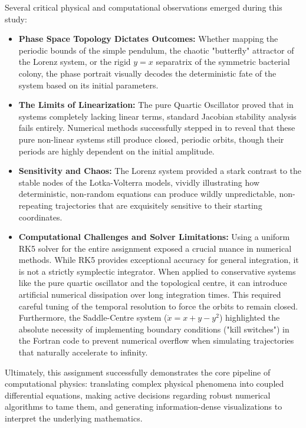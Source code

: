 \documentclass[12pt, a4paper, twoside]{article}
\begin{document}
    Several critical physical and computational observations emerged during this study:
    \begin{itemize}
        \item {\bf Phase Space Topology Dictates Outcomes:} Whether mapping the periodic bounds of the simple pendulum, the chaotic "butterfly" attractor of the Lorenz system, or the rigid $y = x$ separatrix of the symmetric bacterial colony, the phase portrait visually decodes the deterministic fate of the system based on its initial parameters.
        \item {\bf The Limits of Linearization:} The pure Quartic Oscillator proved that in systems completely lacking linear terms, standard Jacobian stability analysis fails entirely. Numerical methods successfully stepped in to reveal that these pure non-linear systems still produce closed, periodic orbits, though their periods are highly dependent on the initial amplitude.
        \item {\bf Sensitivity and Chaos:} The Lorenz system provided a stark contrast to the stable nodes of the Lotka-Volterra models, vividly illustrating how deterministic, non-random equations can produce wildly unpredictable, non-repeating trajectories that are exquisitely sensitive to their starting coordinates.
        \item {\bf Computational Challenges and Solver Limitations:} Using a uniform RK5 solver for the entire assignment exposed a crucial nuance in numerical methods. While RK5 provides exceptional accuracy for general integration, it is not a strictly symplectic integrator. When applied to conservative systems like the pure quartic oscillator and the topological centre, it can introduce artificial numerical dissipation over long integration times. This required careful tuning of the temporal resolution to force the orbits to remain closed. Furthermore, the Saddle-Centre system ($\dot{x} = x + y - y^2$) highlighted the absolute necessity of implementing boundary conditions ("kill switches") in the Fortran code to prevent numerical overflow when simulating trajectories that naturally accelerate to infinity.
    \end{itemize}
    Ultimately, this assignment successfully demonstrates the core pipeline of computational physics: translating complex physical phenomena into coupled differential equations, making active decisions regarding robust numerical algorithms to tame them, and generating information-dense visualizations to interpret the underlying mathematics.
\end{document}
